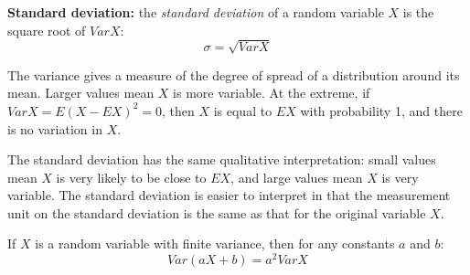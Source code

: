 \begin{definition}
	\textbf{Standard deviation:} the \textit{standard deviation} of a random variable $X$ is the square root of $Var X$:
	\[
		\sigma = \sqrt{VarX}
	\]
\end{definition}

The variance gives a measure of the degree of spread of a distribution around its mean. Larger values mean $X$ is more variable. At the extreme, if $VarX = E(X - EX)^2 = 0$, then $X$ is equal to $EX$ with probability 1, and there is no variation in $X$.

The standard deviation has the same qualitative interpretation: small values mean $X$ is very likely to be close to $EX$, and large values mean $X$ is very variable. The standard deviation is easier to interpret in that the measurement unit on the standard deviation is the same as that for the original variable $X$.

\begin{theorem}
	If $X$ is a random variable with finite variance, then for any constants $a$ and $b$:
	\[
		Var(aX + b) = a^2 VarX
	\]
\end{theorem}

\begin{definition}
	\textbf{}
\end{definition}
\begin{definition}
	\textbf{}
\end{definition}